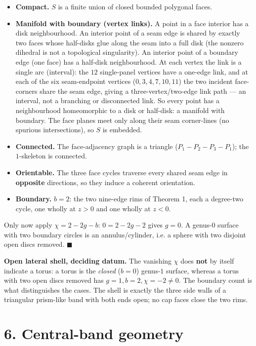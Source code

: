 \documentclass[
  11pt,
  a4paper,
]{article}
\providecommand{\tightlist}{%
  \setlength{\itemsep}{0pt}\setlength{\parskip}{0pt}}
\begin{document}
\begin{itemize}
\tightlist
\item
  \textbf{Compact.} \(S\) is a finite union of closed bounded polygonal faces.
\item
  \textbf{Manifold with boundary (vertex links).} A point in a face interior has a disk neighbourhood. An interior point of a seam edge is shared by exactly two faces whose half-disks glue along the seam into a full disk (the nonzero dihedral is not a topological singularity). An interior point of a boundary edge (one face) has a half-disk neighbourhood. At each vertex the link is a single arc (interval): the \(12\) single-panel vertices have a one-edge link, and at each of the six seam-endpoint vertices (\(0,3,4,7,10,11\)) the two incident face-corners share the seam edge, giving a three-vertex/two-edge link path --- an interval, not a branching or disconnected link. So every point has a neighbourhood homeomorphic to a disk or half-disk: a manifold with boundary. The face planes meet only along their seam corner-lines (no spurious intersections), so \(S\) is embedded.
\item
  \textbf{Connected.} The face-adjacency graph is a triangle (\(P_1\!-\!P_2\!-\!P_3\!-\!P_1\)); the \(1\)-skeleton is connected.
\item
  \textbf{Orientable.} The three face cycles traverse every shared seam edge in \textbf{opposite} directions, so they induce a coherent orientation.
\item
  \textbf{Boundary.} \(b=2\): the two nine-edge rims of Theorem 1, each a degree-two cycle, one wholly at \(z>0\) and one wholly at \(z<0\).
\end{itemize}

Only now apply \(\chi=2-2g-b\): \(0=2-2g-2\) gives \(g=0\). A genus-\(0\) surface with two boundary circles is an annulus/cylinder, i.e. a sphere with two disjoint open discs removed. \(\blacksquare\)

\textbf{Open lateral shell, deciding datum.} The vanishing \(\chi\) does \textbf{not} by itself indicate a torus: a torus is the \emph{closed} (\(b=0\)) genus-\(1\) surface, whereas a torus with two open discs removed has \(g=1,b=2,\chi=-2\ne0\). The boundary count is what distinguishes the cases. The shell is exactly the three side walls of a triangular prism-like band with both ends open; no cap faces close the two rims.

\section{6. Central-band geometry}\label{central-band-geometry}
\end{document}
